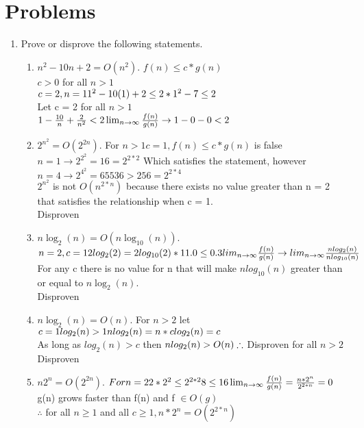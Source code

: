 \documentclass[11pt]{amsart}
\begin{document}
\section*{Problems}

%


\begin{enumerate}
\item Prove or disprove the following statements.
\begin{enumerate}
\item $n^2 - 10n + 2 = O(n^2)$.
\subitem $f(n)\leq c*g(n)$\\$c>0$ for all $n>1$\\$c=2, n=1\\1^2-10(1)+2\leq 2*1^2\\-7\leq 2$\\Let c = 2 for all $n > 1$\\$1-\frac{10}{n}+\frac{2}{n^2}<2\\\lim_{n \to \infty}\frac{f(n)}{g(n)}\rightarrow 1 - 0 - 0 < 2$  
\item $2^{n^2} = O(2^{2n})$.
\subitem For $n > 1 c = 1, f(n)\leq c*g(n)$ is false\\$n=1 \rightarrow 2^{2^2} = 16 = 2^{2*2}$ Which satisfies the statement, however\\$n = 4 \rightarrow 2^{4^2} = 65536 > 256 = 2^{2*4}$\\$2^{n^2}$ is not $O(n^{2*n})$ because there exists no value greater than n = 2 that satisfies the relationship when c = 1.\\Disproven
\item $n\log_2(n) = O(n\log_{10}(n))$.
\subitem $n = 2, c = 1\\2log_2(2) = 2log_{10}(2)*1\\1.0 \leq 0.3\\lim_{n \to \infty}\frac{f(n)}{g(n)} \rightarrow lim_{n \to \infty}\frac{nlog_2(n)}{nlog_{10}(n)}$\\For any c there is no value for n that will make $nlog_{10}(n)$ greater than or equal to $n\log_2(n)$.\\Disproven
\item $n\log_2(n) = O(n)$.
\subitem For $n>2$ let $c = 1\\log_2(n) > 1\\nlog_2(n)=n*c\\log_2(n)=c$\\As long as $log_2(n) > c$ then $nlog_2(n) > O(n)\\\therefore$ Disproven for all $n>2$ \\Disproven
\item $n2^n = O(2^{2n})$.
\subitem $For n = 2\\2*2^2 \leq 2^{2*2}\\8 \leq 16\\\lim_{n \to \infty}\frac{f(n)}{g(n)} =\frac{n*2^n}{2^{2*n}} = 0$\\g(n) grows faster than f(n) and f $\in O(g)$\\$\therefore$ for all $n\geq 1$ and all $c \geq 1, n*2^n = O(2^{2*n})$
\end{enumerate}





\end{enumerate}
\end{document}
